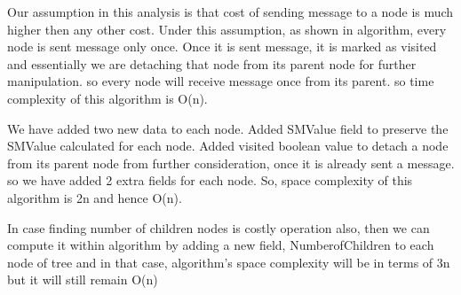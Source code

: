 Our assumption in this analysis is that cost of sending message to a node is much higher then any other cost. Under this assumption, as shown in algorithm, every node is sent message only once. Once it is sent message, it is marked as visited and essentially we are detaching that node from its parent node for further manipulation. so every node will receive message once from its parent. so time complexity of this algorithm is O(n). 

We have added two new data to each node. Added SMValue field to preserve the SMValue calculated for each node. Added visited boolean value to detach a node from its parent node from further consideration, once it is already sent a message. so we have added 2 extra fields for each node. So, space complexity of this algorithm is 2n and hence O(n).  

In case finding number of children nodes is costly operation also, then we can compute it within algorithm by adding a new field, NumberofChildren to each node of tree and in that case, algorithm's space complexity will be in terms of 3n but it will still remain O(n)


